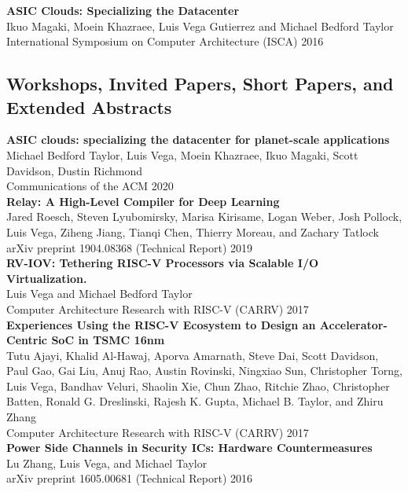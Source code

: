 \documentclass[10pt]{article}
\begin{document}
\textbf{%
  ASIC Clouds: Specializing the Datacenter
} \\
Ikuo Magaki, Moein Khazraee, Luis Vega Gutierrez and Michael Bedford Taylor \\
International Symposium on Computer Architecture (ISCA) 2016 \\

\subsection*{Workshops, Invited Papers, Short Papers, and Extended Abstracts}

\textbf{%
  ASIC clouds: specializing the datacenter for planet-scale applications
} \\
Michael Bedford Taylor, Luis Vega, Moein Khazraee, Ikuo Magaki,
Scott Davidson, Dustin Richmond \\
Communications of the ACM 2020 \\

\textbf{%
  Relay: A High-Level Compiler for Deep Learning
} \\
Jared Roesch, Steven Lyubomirsky, Marisa Kirisame, Logan Weber, Josh Pollock,
Luis Vega, Ziheng Jiang, Tianqi Chen, Thierry Moreau, and Zachary Tatlock \\
arXiv preprint 1904.08368 (Technical Report) 2019 \\ 

\textbf{%
  RV-IOV: Tethering RISC-V Processors via Scalable I/O Virtualization.
} \\
Luis Vega and Michael Bedford Taylor \\
Computer Architecture Research with RISC-V (CARRV) 2017 \\

\textbf{%
  Experiences Using the RISC-V Ecosystem to Design an Accelerator-Centric SoC in TSMC 16nm
} \\
Tutu Ajayi, Khalid Al-Hawaj, Aporva Amarnath, Steve Dai, Scott Davidson,
Paul Gao, Gai Liu, Anuj Rao, Austin Rovinski, Ningxiao Sun, Christopher Torng,
Luis Vega, Bandhav Veluri, Shaolin Xie, Chun Zhao, Ritchie Zhao, Christopher Batten,
Ronald G. Dreslinski, Rajesh K. Gupta, Michael B. Taylor, and Zhiru Zhang \\
Computer Architecture Research with RISC-V (CARRV) 2017 \\

\textbf{%
  Power Side Channels in Security ICs: Hardware Countermeasures
} \\
Lu Zhang, Luis Vega, and Michael Taylor \\
arXiv preprint 1605.00681 (Technical Report) 2016 \\ 
\end{document}
